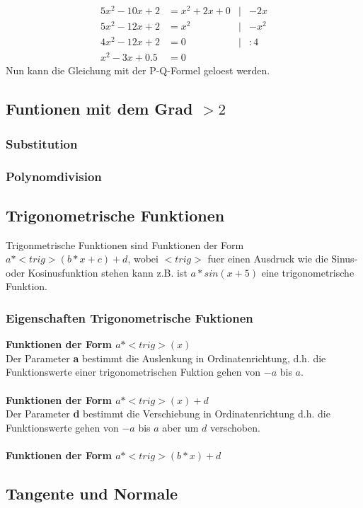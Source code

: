\documentclass[a4paper]{article} %
\begin{document}
		\begin{align*}
			5x^2-10x+2 &= x^2+2x+0 & 	|&-2x\\
			5x^2-12x+2 &= x^2 & 		|&-x^2\\
			4x^2-12x+2 &= 0   & 		|&:4\\
			x^2-3x+0.5 &= 0 	
		\end{align*}
			Nun kann die Gleichung mit der P-Q-Formel geloest werden.
		\newpage
		\subsection{Funtionen mit dem Grad $> 2$}
		\subsubsection{Substitution}
		\subsubsection{Polynomdivision}
		\subsection{Trigonometrische Funktionen}
		Trigonmetrische Funktionen sind Funktionen der Form $a*<trig>(b*x+c)+d$, wobei $<trig>$ fuer einen Ausdruck wie die Sinus- oder Kosinusfunktion stehen kann z.B. ist $a*sin(x+5)$ eine trigonometrische Funktion.
		\subsubsection{Eigenschaften Trigonometrische Fuktionen\\}
		\textbf{Funktionen der Form $a*<trig>(x)$\\}
		Der Parameter \textbf{a} bestimmt die Auslenkung in Ordinatenrichtung, d.h. die Funktionswerte einer trigonometrischen Fuktion gehen von $-a$ bis  $a$.\\\\
		\textbf{Funktionen der Form $a*<trig>(x)+d$\\}
		Der Parameter \textbf{d} bestimmt die Verschiebung in Ordinatenrichtung d.h. die Funktionswerte gehen von $-a$ bis $a$ aber um $d$ verschoben.\\\\
		\textbf{Funktionen der Form $a*<trig>(b*x)+d$\\}

		\subsection{Tangente und Normale}
\end{document}
